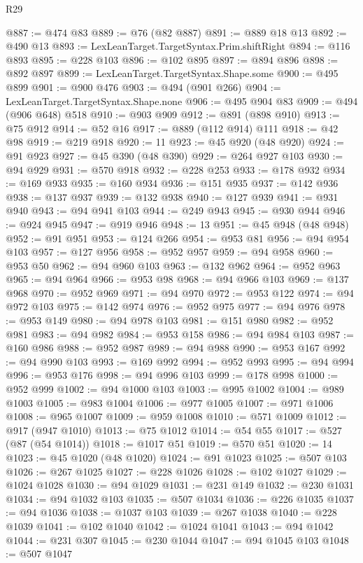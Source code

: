 \begin{lexlean}{R29}
\begin{coremodule}
@887 := @474 @83
@889 := @76 (@82 @887)
@891 := @889 @18 @13
@892 := @490 @13
@893 := LexLeanTarget.TargetSyntax.Prim.shiftRight
@894 := @116 @893
@895 := @228 @103
@896 := @102 @895
@897 := @894 @896
@898 := @892 @897
@899 := LexLeanTarget.TargetSyntax.Shape.some
@900 := @495 @899
@901 := @900 @476
@903 := @494 (@901 @266)
@904 := LexLeanTarget.TargetSyntax.Shape.none
@906 := @495 @904 @83
@909 := @494 (@906 @648) @518
@910 := @903 @909
@912 := @891 (@898 @910)
@913 := @75 @912
@914 := @52 @16
@917 := @889 (@112 @914) @111
@918 := @42 @98
@919 := @219 @918
@920 := 11
@923 := @45 @920 (@48 @920)
@924 := @91 @923
@927 := @45 @390 (@48 @390)
@929 := @264 @927 @103
@930 := @94 @929
@931 := @570 @918
@932 := @228 @253
@933 := @178 @932
@934 := @169 @933
@935 := @160 @934
@936 := @151 @935
@937 := @142 @936
@938 := @137 @937
@939 := @132 @938
@940 := @127 @939
@941 := @931 @940
@943 := @94 @941 @103
@944 := @249 @943
@945 := @930 @944
@946 := @924 @945
@947 := @919 @946
@948 := 13
@951 := @45 @948 (@48 @948)
@952 := @91 @951
@953 := @124 @266
@954 := @953 @81
@956 := @94 @954 @103
@957 := @127 @956
@958 := @952 @957
@959 := @94 @958
@960 := @953 @50
@962 := @94 @960 @103
@963 := @132 @962
@964 := @952 @963
@965 := @94 @964
@966 := @953 @98
@968 := @94 @966 @103
@969 := @137 @968
@970 := @952 @969
@971 := @94 @970
@972 := @953 @122
@974 := @94 @972 @103
@975 := @142 @974
@976 := @952 @975
@977 := @94 @976
@978 := @953 @149
@980 := @94 @978 @103
@981 := @151 @980
@982 := @952 @981
@983 := @94 @982
@984 := @953 @158
@986 := @94 @984 @103
@987 := @160 @986
@988 := @952 @987
@989 := @94 @988
@990 := @953 @167
@992 := @94 @990 @103
@993 := @169 @992
@994 := @952 @993
@995 := @94 @994
@996 := @953 @176
@998 := @94 @996 @103
@999 := @178 @998
@1000 := @952 @999
@1002 := @94 @1000 @103
@1003 := @995 @1002
@1004 := @989 @1003
@1005 := @983 @1004
@1006 := @977 @1005
@1007 := @971 @1006
@1008 := @965 @1007
@1009 := @959 @1008
@1010 := @571 @1009
@1012 := @917 (@947 @1010)
@1013 := @75 @1012
@1014 := @54 @55
@1017 := @527 (@87 (@54 @1014))
@1018 := @1017 @51
@1019 := @570 @51
@1020 := 14
@1023 := @45 @1020 (@48 @1020)
@1024 := @91 @1023
@1025 := @507 @103
@1026 := @267 @1025
@1027 := @228 @1026
@1028 := @102 @1027
@1029 := @1024 @1028
@1030 := @94 @1029
@1031 := @231 @149
@1032 := @230 @1031
@1034 := @94 @1032 @103
@1035 := @507 @1034
@1036 := @226 @1035
@1037 := @94 @1036
@1038 := @1037 @103
@1039 := @267 @1038
@1040 := @228 @1039
@1041 := @102 @1040
@1042 := @1024 @1041
@1043 := @94 @1042
@1044 := @231 @307
@1045 := @230 @1044
@1047 := @94 @1045 @103
@1048 := @507 @1047

\end{coremodule}
\end{lexlean}
